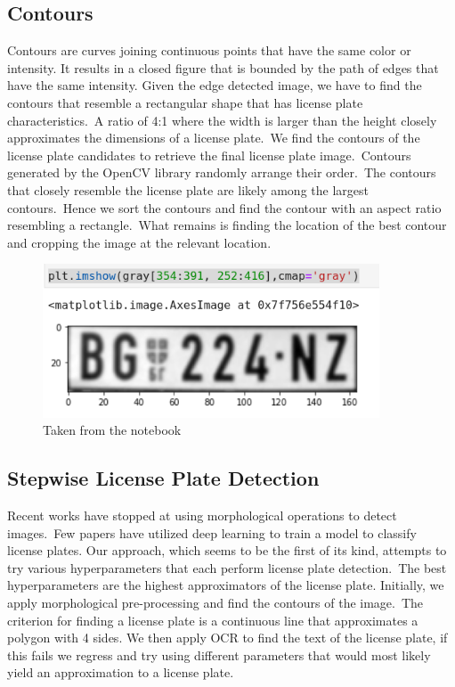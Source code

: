\documentclass[a4paper,twoside,10pt]{report}
\begin{document}
\subsection{Contours}
Contours are curves joining continuous points that have the same color or intensity. It results in a closed figure that is bounded by the path of edges that have the same intensity.
Given the edge detected image, we have to find the contours that resemble a rectangular shape that has license plate characteristics.\ 
A ratio of 4:1 where the width is larger than the height closely approximates the dimensions of a license plate.\ 
We find the contours of the license plate candidates to retrieve the final license plate image.\ 
Contours generated by the OpenCV library randomly arrange their order.\ 
The contours that closely resemble the license plate are likely among the largest contours.\ 
Hence we sort the contours and find the contour with an aspect ratio resembling a rectangle.\ 
What remains is finding the location of the best contour and cropping the image at the relevant location. 
\begin{center}
  \begin{figure}[h!]
    \includegraphics[width=10cm]{images/result.png}
    \caption{Taken from the notebook}
  \end{figure}
\end{center}
\subsection{Stepwise License Plate Detection}
Recent works have stopped at using morphological operations to detect images.\
Few papers have utilized deep learning to train a model to classify license plates.
Our approach, which seems to be the first of its kind, attempts to try various hyperparameters that each perform license plate detection.\ 
The best hyperparameters are the highest approximators of the license plate.
Initially, we apply morphological pre-processing and find the contours of the image.\ 
The criterion for finding a license plate is a continuous line that approximates a polygon with 4 sides. 
We then apply OCR to find the text of the license plate, if this fails we regress and try using different parameters that would most likely yield an approximation to a license plate.
\end{document}

